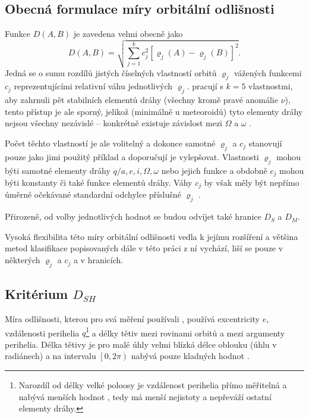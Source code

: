 \subsection{Obecná formulace míry orbitální odlišnosti}%
Funkce $D(A,B)$ je zavedena velmi obecně jako \cite{dsh}
\begin{equation}
    D(A,B)=\sqrt{
    \sum_{j=1}^{k}{c_j^2\left[ \varrho_j(A)-\varrho_j(B) \right]^2}
    }\text{.}
\end{equation}
Jedná se o sumu rozdílů jistých číselných vlastností orbitů $\varrho_j$ vážených funkcemi $c_j$ reprezentujícími relativní váhu jednotlivých $\varrho_j$. \citeauthor{dsh} pracují s $k=5$ vlastnostmi, aby zahrnuli pět stabilních elementů dráhy (všechny kromě pravé anomálie $\nu$), tento přístup je ale sporný, jelikož (minimálně u meteoroidů) tyto elementy dráhy nejsou všechny nezávislé -- konkrétně existuje závislost mezi $\Omega$ a $\omega$ \cite{remarks}.

Počet těchto vlastností je ale volitelný a dokonce samotné $\varrho_j$ a $c_j$ \citeauthor{dsh} stanovují pouze jako jimi použitý příklad a doporučují je vylepšovat. Vlastnosti $\varrho_j$ mohou býti samotné elementy dráhy $q/a,e,i,\Omega,\omega$ nebo jejich funkce a obdobně $c_j$ mohou býti konstanty či také funkce elementů dráhy. Váhy $c_j$ by však měly být nepřímo úměrné očekávané standardní odchylce příslušné $\varrho_j$ \cite{dsh}.

Přirozeně, od volby jednotlivých hodnot se budou odvíjet také hranice $D_S$ a $D_M$.

\smallskip

Vysoká flexibilita této míry orbitální odlišnosti vedla k jejímu rozšíření a většina metod klasifikace popisovaných dále v této práci z ní vychází, liší se pouze v některých $\varrho_j$ a $c_j$ a v hranicích.

\subsection{Kritérium $D_{SH}$}%
Míra odlišnosti, kterou pro svá měření používali \citeauthor{dsh}, používá excentricity $e$, vzdálenosti perihelia $q$\footnote{Narozdíl od délky velké poloosy je vzdálenost perihelia přímo měřitelná a nabývá menších hodnot \cite{dsh}, tedy má menší nejistoty a nepřeváží ostatní elementy dráhy.} a délky tětiv mezi rovinami orbitů a mezi argumenty perihelia. Délka tětivy je pro malé úhly velmi blízká délce oblouku (úhlu v radiánech) a na intervalu $\left[0,2\pi\right)$ nabývá pouze kladných hodnot \cite{dsh}.

